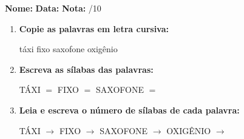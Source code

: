 \begin{exercicio}



\noindent\textbf{Nome:} \underline{\hspace{3.2cm}} \quad \textbf{Data:} \underline{\hspace{1.6cm}} \quad \textbf{Nota:} \underline{\hspace{0.9cm}}/10


\begin{enumerate}

  \item \textbf{Copie as palavras em letra cursiva:}
  \begin{center}
  táxi \quad fixo \quad saxofone \quad oxigênio
  \end{center}
  \begin{center}
  \underline{\hspace{2.4cm}} \quad \underline{\hspace{2.4cm}} \quad \underline{\hspace{2.4cm}} \quad \underline{\hspace{2.4cm}}
  \end{center}

  \item \textbf{Escreva as sílabas das palavras:}
  \begin{center}
  TÁXI $=$ \underline{\hspace{1.5cm}} \underline{\hspace{1.5cm}} \quad FIXO $=$ \underline{\hspace{1.5cm}} \underline{\hspace{1.5cm}} \quad SAXOFONE $=$ \underline{\hspace{1.5cm}} \underline{\hspace{1.5cm}}
  \end{center}

  \item \textbf{Leia e escreva o número de sílabas de cada palavra:}
  \begin{center}
  TÁXI $\rightarrow$ \underline{\hspace{0.9cm}} \quad FIXO $\rightarrow$ \underline{\hspace{0.9cm}} \quad SAXOFONE $\rightarrow$ \underline{\hspace{0.9cm}} \quad OXIGÊNIO $\rightarrow$ \underline{\hspace{0.9cm}}
  \end{center}


\end{enumerate}
\end{exercicio}
